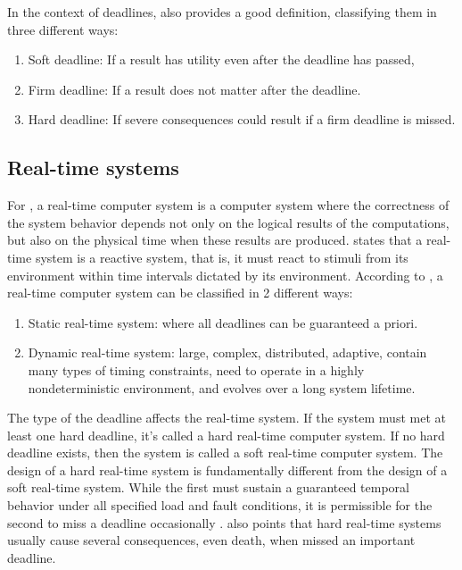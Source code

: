 \documentclass[12pt]{article}
\begin{document}
In the context of deadlines, \cite{kopetz2011real} also provides a good definition, classifying them in 
three different ways:
\begin{enumerate}
 \item Soft deadline: If a result has utility even after the deadline has passed,
 \item Firm deadline: If a result does not matter after the deadline.
 \item Hard deadline: If severe consequences could result if a firm deadline is missed.
\end{enumerate}

\subsection{Real-time systems}


For \cite{kopetz2011real}, a real-time computer system is a computer system where the correctness 
of the system behavior depends not only on the logical results of the computations, but also on 
the physical time when these results are produced. \cite{lichtenstein1985glory} states that a real-time system 
is a reactive system, that is, it must react to stimuli from its environment within time intervals dictated by 
its environment. According to \cite{stankovic1990predictability}, a real-time computer system can be classified 
in 2 different ways:
\begin{enumerate}
 \item Static real-time system: where all deadlines can be guaranteed a priori.
 \item Dynamic real-time system: large, complex, distributed, adaptive, contain many types of timing constraints, 
need to operate in a highly nondeterministic environment, and evolves over a long system lifetime.
\end{enumerate}

The type of the deadline affects the real-time system. If the system must met at least
one hard deadline, it's called a hard real-time computer system.  If no hard deadline exists, 
then the system is called a soft real-time computer system. The design of a hard real-time system is 
fundamentally different from the design of a soft real-time system. While the first must sustain a guaranteed 
temporal behavior under all specified load and fault conditions, it is permissible for the second to miss a 
deadline occasionally \cite{kopetz2011real}. \cite{stankovic1996real} also points that hard real-time systems 
usually cause several consequences, even death, when missed an important deadline.
\end{document}
